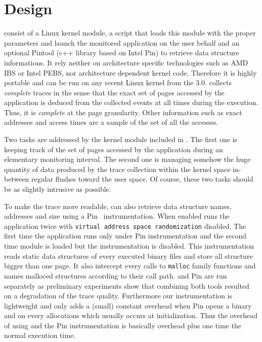 \section{Design}
\label{sec:design}


\Moca consist of a Linux kernel module, a script that loads this module with
the proper parameters and launch the monitored application on the user behalf
and an optional Pintool (c++ library based on Intel Pin) to retrieve data
structure informations.
It rely neither on architecture specific
technologies such as AMD IBS or Intel PEBS, nor architecture dependent kernel
code. Therefore it is highly portable and can be run on any recent Linux kernel
from the $3.0$. \Moca collects \emph{complete} traces in the sense that the exact set
of pages accessed by the application is deduced from the collected events
at all times during the execution. Thus, it is \emph{complete} at the page granularity.
Other information such as exact addresses and access times are a sample of
the set of all the accesses.

Two tasks are addressed by the kernel module included in \Moca. The first one is
keeping track of the set of pages accessed by the application during an elementary monitoring
interval. The second one is managing somehow the huge quantity of data produced
by the trace collection within the kernel space in-between regular flushes toward
the user space. Of course, these two tasks should be as slightly intrusive as possible.

To make the trace more readable, \Moca can also retrieve data structure
names, addresses and size using a Pin~\cite{Luk05Pin}
instrumentation. When enabled \Moca runs the application twice with \texttt{virtual
address space randomization} disabled. The first time the application runs only
under Pin instrumentation and the second time \Moca module is loaded but the
instrumentation is disabled. This instrumentation reads static data
structures of every executed binary files and store all structure bigger than
one page. It also intercept every calls to \texttt{malloc} family functions
and names malloced structures according to their call path.
\Moca and Pin are run separately as preliminary experiments show that combining both
tools resulted on a degradation of the trace quality. Furthermore our
instrumentation is lightweight and only  adds a (small) constant overhead when
Pin opens a binary and on every allocations which usually occurs at
initialization. Thus the overhead of using \Moca and the Pin instrumentation
is basically \Moca overhead plus one time the normal execution time.

